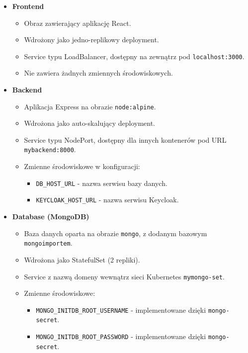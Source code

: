 \documentclass[12pt,a4paper]{article}
\begin{document}
\begin{itemize}
    \item \textbf{Frontend} 
    \begin{itemize}
        \item Obraz zawierający aplikację React.
        \item Wdrożony jako jedno-replikowy deployment.
        \item Service typu LoadBalancer, dostępny na zewnątrz pod \texttt{localhost:3000}.
        \item Nie zawiera żadnych zmiennych środowiskowych.
    \end{itemize}

    \item \textbf{Backend}
    \begin{itemize}
        \item Aplikacja Express na obrazie \texttt{node:alpine}.
        \item Wdrożona jako auto-skalujący deployment.
        \item Service typu NodePort, dostępny dla innych kontenerów pod URL \texttt{mybackend:8000}.
        \item Zmienne środowiskowe w konfiguracji:
        \begin{itemize}
            \item \texttt{DB\_HOST\_URL} - nazwa serwisu bazy danych.
            \item \texttt{KEYCLOAK\_HOST\_URL} - nazwa serwisu Keycloak.
        \end{itemize}
    \end{itemize}

    \item \textbf{Database (MongoDB)}
    \begin{itemize}
        \item Baza danych oparta na obrazie \texttt{mongo}, z dodanym bazowym \texttt{mongoimportem}.
        \item Wdrożona jako StatefulSet (2 repliki).
        \item Service z nazwą domeny wewnątrz sieci Kubernetes \texttt{mymongo-set}.
        \item Zmienne środowiskowe:
        \begin{itemize}
            \item \texttt{MONGO\_INITDB\_ROOT\_USERNAME} - implementowane dzięki \texttt{mongo-secret}.
            \item \texttt{MONGO\_INITDB\_ROOT\_PASSWORD} - implementowane dzięki \texttt{mongo-secret}.
        \end{itemize}
    \end{itemize}


\end{itemize}
\end{document}

